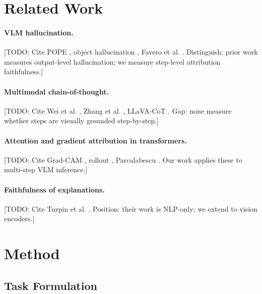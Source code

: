 \documentclass{colm2026}
\begin{document}
\section{Related Work}
\label{sec:related}

\paragraph{VLM hallucination.}
[TODO: Cite POPE \citep{li2023pope}, object hallucination \citep{rohrbach2018hallucination},
Favero et al. \citep{favero2024multimodal}. Distinguish: prior work measures
output-level hallucination; we measure step-level attribution faithfulness.]

\paragraph{Multimodal chain-of-thought.}
[TODO: Cite Wei et al. \citep{wei2022chain}, Zhang et al. \citep{zhang2023multimodal_cot},
LLaVA-CoT \citep{bai2024llava_cot}. Gap: none measure whether steps are
visually grounded step-by-step.]

\paragraph{Attention and gradient attribution in transformers.}
[TODO: Cite Grad-CAM \citep{selvaraju2017gradcam}, rollout \citep{abnar2020rollout},
Parcalabescu \citep{parcalabescu2023measuring}. Our work applies these to
multi-step VLM inference.]

\paragraph{Faithfulness of explanations.}
[TODO: Cite Turpin et al. \citep{agrawal2024faithfulness}.
Position: their work is NLP-only; we extend to vision encoders.]

\section{Method}
\label{sec:method}

\subsection{Task Formulation}
\label{sec:formulation}
\end{document}
